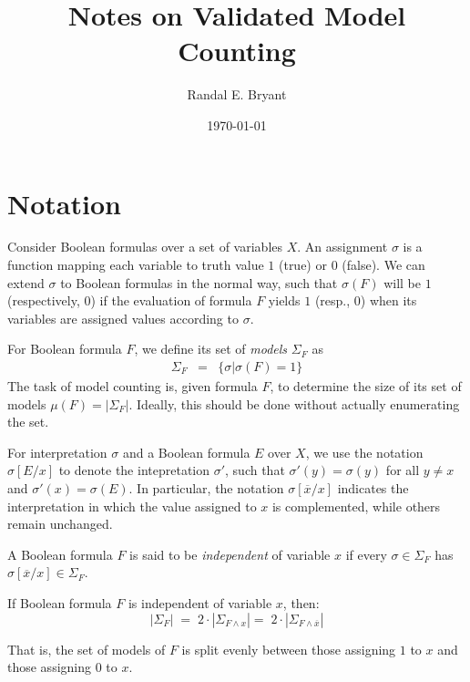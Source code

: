 \documentclass{llncs}
\title{Notes on Validated Model Counting}
\author{Randal E. Bryant}
\institute{
Computer Science Department \\
Carnegie Mellon University, Pittsburgh, PA, United States
}
\date{\today}
\newcommand{\tautology}{1}
\newcommand{\nil}{0}
\newcommand{\obar}[1]{\overline{#1}}
\newcommand{\interp}{\sigma}
\newcommand{\interpset}[1]{\Sigma_{#1}}
\newcommand{\mcount}{\mu}
\newcommand{\subs}[2]{[#2/#1]}
\newcommand{\subsflip}[1]{\subs{#1}{\obar{#1}}}
\begin{document}
\maketitle

\section{Notation}

Consider Boolean formulas over a set of variables $X$.  An
assignment $\interp$ is a function mapping each variable to 
truth value $\tautology$ (true) or $\nil$ (false).  We can extend
$\interp$ to Boolean formulas in the normal way, such that
$\interp(F)$ will be $\tautology$ (respectively, $\nil$) if the
evaluation of formula $F$ yields $\tautology$ (resp., $\nil$) when its
variables are assigned values according to $\interp$.

For Boolean formula $F$, we define its set of {\em models} $\interpset{F}$ as
\begin{eqnarray}
\interpset{F} & = & \{ \interp | \interp(F) = \tautology \}
\end{eqnarray}
The task of model counting is, given formula $F$, to determine the size of its set of models
$\mcount(F) = |\interpset{F}|$.  Ideally, this should be done without actually enumerating the set.

For interpretation $\interp$ and a Boolean formula $E$ over $X$, we
use the notation $\interp\subs{x}{E}$ to denote the intepretation
$\interp'$, such that $\interp'(y) = \interp(y)$ for all $y \not = x$
and $\interp'(x) = \interp(E)$.  In particular, the notation
$\interp\subsflip{x}$ indicates the interpretation in which the value
assigned to $x$ is complemented, while others remain unchanged.

A Boolean formula $F$ is said to be {\em independent} of variable $x$
if every $\interp \in \interpset{F}$ has $\interp\subsflip{x} \in
\interpset{F}$.

\begin{lemma}
\label{lemma:independent:split}
If Boolean formula $F$ is independent of variable $x$, then:
\begin{equation}
|\interpset{F}| \; = \; 2\cdot |\interpset{F\land x}| = \; 2\cdot |\interpset{F\land \obar{x}}| \label{eqn:independent}
\end{equation}  
\end{lemma}  
That is, the set of models of $F$ is split evenly between
those assigning $\tautology$ to $x$ and those assigning $\nil$ to $x$.
\end{document}
